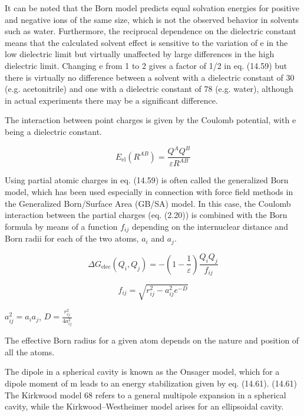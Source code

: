 It can be noted that the Born model predicts equal solvation energies
for positive and negative ions of the same size, which is not the
observed behavior in solvents such as water. Furthermore, the reciprocal
dependence on the dielectric constant means that the calculated solvent
effect is sensitive to the variation of e in the low dielectric limit
but virtually unaffected by large differences in the high dielectric
limit. Changing e from 1 to 2 gives a factor of 1/2 in eq. (14.59)
but there is virtually no difference between a solvent with a dielectric
constant of 30 (e.g. acetonitrile) and one with a dielectric constant
of 78 (e.g. water), although in actual experiments there may be a
significant difference.

The interaction between point charges is given by the Coulomb potential,
with e being a dielectric constant.

\begin{equation}
E_{\mathrm{el}}(R^{AB})=\frac{Q^{A}Q^{B}}{\varepsilon R^{AB}}
\end{equation}


Using partial atomic charges in eq. (14.59) is often called the generalized
Born model, which has been used especially in connection with force
field methods in the Generalized Born/Surface Area (GB/SA) model.
In this case, the Coulomb interaction between the partial charges
(eq. (2.20)) is combined with the Born formula by means of a function
$f_{ij}$ depending on the internuclear distance and Born radii for
each of the two atoms, $a_{i}$ and $a_{j}$.

\begin{equation}
\Delta G_{\mathrm{elec}}(Q_{i},Q_{j})=-\left(1-\frac{1}{\varepsilon}\right)\frac{Q_{i}Q_{j}}{f_{ij}}
\end{equation}


\begin{equation}
f_{ij}=\sqrt{r_{ij}^{2}-a_{ij}^{2}e^{-D}}
\end{equation}


$a_{ij}^{2}=a_{i}a_{j}$, $D=\frac{r_{ij}^{2}}{4a_{ij}^{2}}$

The effective Born radius for a given atom depends on the nature and
position of all the atoms.

The dipole in a spherical cavity is known as the Onsager model, which
for a dipole moment of m leads to an energy stabilization given by
eq. (14.61). (14.61) The Kirkwood model 68 refers to a general multipole
expansion in a spherical cavity, while the Kirkwood–Westheimer model
arises for an ellipsoidal cavity.

